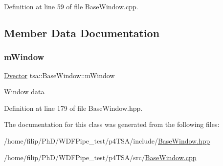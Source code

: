 Definition at line 59 of file Base\+Window.\+cpp.



\subsection{Member Data Documentation}
\mbox{\label{classtsa_1_1_base_window_a182b397ac3f3c409bfcb3a39d9c1575a}} 
\subsubsection{\texorpdfstring{m\+Window}{mWindow}}
{\footnotesize\ttfamily \hyperlink{namespacetsa_a8900fb03d849baf447a1a0efe2561fb2}{Dvector} tsa\+::\+Base\+Window\+::m\+Window\hspace{0.3cm}{\ttfamily [protected]}}

Window data 

Definition at line 179 of file Base\+Window.\+hpp.



The documentation for this class was generated from the following files\+:\begin{DoxyCompactItemize}
\item 
/home/filip/\+Ph\+D/\+W\+D\+F\+Pipe\+\_\+test/p4\+T\+S\+A/include/\hyperlink{_base_window_8hpp}{Base\+Window.\+hpp}\item 
/home/filip/\+Ph\+D/\+W\+D\+F\+Pipe\+\_\+test/p4\+T\+S\+A/src/\hyperlink{_base_window_8cpp}{Base\+Window.\+cpp}\end{DoxyCompactItemize}
